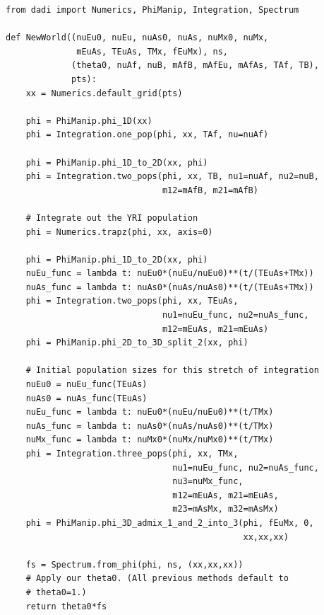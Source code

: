 \documentclass[12pt]{article}
\makeatletter
\newcommand{\dadi}{$\partial$a$\partial$i\xspace}
\newcommand{\py}[1]{\lstinline[language=Python, showstringspaces=False]@#1@}
\makeatother
\begin{document}
\begin{lstlisting}[caption={\textbf{Settlement-of-New-World model from Gutenkunst (2009):} Because \dadi is limited to 3 simultaneous populations, we need to integrate out the African population, using \py{Numerics.trapz}. This model also employs a fixed $\theta$, and ancillary parameters passed in using the third argument.}, float, label={lst:new_world},basicstyle=\tt\footnotesize]
from dadi import Numerics, PhiManip, Integration, Spectrum

def NewWorld((nuEu0, nuEu, nuAs0, nuAs, nuMx0, nuMx,
              mEuAs, TEuAs, TMx, fEuMx), ns, 
             (theta0, nuAf, nuB, mAfB, mAfEu, mAfAs, TAf, TB),
             pts):
    xx = Numerics.default_grid(pts)

    phi = PhiManip.phi_1D(xx)
    phi = Integration.one_pop(phi, xx, TAf, nu=nuAf)

    phi = PhiManip.phi_1D_to_2D(xx, phi)
    phi = Integration.two_pops(phi, xx, TB, nu1=nuAf, nu2=nuB, 
                               m12=mAfB, m21=mAfB)

    # Integrate out the YRI population
    phi = Numerics.trapz(phi, xx, axis=0)

    phi = PhiManip.phi_1D_to_2D(xx, phi)
    nuEu_func = lambda t: nuEu0*(nuEu/nuEu0)**(t/(TEuAs+TMx))
    nuAs_func = lambda t: nuAs0*(nuAs/nuAs0)**(t/(TEuAs+TMx))
    phi = Integration.two_pops(phi, xx, TEuAs, 
                               nu1=nuEu_func, nu2=nuAs_func, 
                               m12=mEuAs, m21=mEuAs)
    phi = PhiManip.phi_2D_to_3D_split_2(xx, phi)

    # Initial population sizes for this stretch of integration
    nuEu0 = nuEu_func(TEuAs)
    nuAs0 = nuAs_func(TEuAs)
    nuEu_func = lambda t: nuEu0*(nuEu/nuEu0)**(t/TMx)
    nuAs_func = lambda t: nuAs0*(nuAs/nuAs0)**(t/TMx)
    nuMx_func = lambda t: nuMx0*(nuMx/nuMx0)**(t/TMx)
    phi = Integration.three_pops(phi, xx, TMx, 
                                 nu1=nuEu_func, nu2=nuAs_func, 
                                 nu3=nuMx_func,
                                 m12=mEuAs, m21=mEuAs,
                                 m23=mAsMx, m32=mAsMx)
    phi = PhiManip.phi_3D_admix_1_and_2_into_3(phi, fEuMx, 0,
                                               xx,xx,xx)

    fs = Spectrum.from_phi(phi, ns, (xx,xx,xx))
    # Apply our theta0. (All previous methods default to 
    # theta0=1.)
    return theta0*fs
\end{lstlisting}
\end{document}
